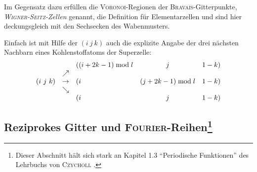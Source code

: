 \documentclass[a4paper, 10pt, twoside, openany]{book} %
\def \mod {\bmod}
\begin{document}
Im Gegensatz dazu erfüllen die \textsc{Voronoi}-Regionen der \textsc{Bravais}-Gitterpunkte, \emph{\textsc{Wigner-Seitz}-Zellen} genannt, die Definition für Elementarzellen und sind hier deckungsgleich mit den Sechsecken des Wabenmusters.

Einfach ist mit Hilfe der $(i \ j \ k)$ auch die explizite Angabe der drei nächsten Nachbarn eines Kohlenstoffatoms der Superzelle:
%
\begin{align*}
    \begin{array}{r c l c r}
        & & ((i + 2 k - 1) \mod l & j & 1 - k) \\
        & \nearrow & & & \\
        (i \ j \ k) & \rightarrow & (i & (j + 2 k - 1) \mod l & 1 - k) \\
        & \searrow & & & \\
        & & (i & j & 1 - k)
    \end{array}
\end{align*}

\subsection[Reziprokes Gitter und \textsc{Fourier}-Reihen]{Reziprokes Gitter und \textsc{Fourier}-Reihen\footnote{Dieser Abschnitt hält sich stark an Kapitel 1.3 "`Periodische Funktionen"' des Lehrbuchs von \textsc{Czycholl} \cite[S.~18f]{Czycholl}.}}
\end{document}
